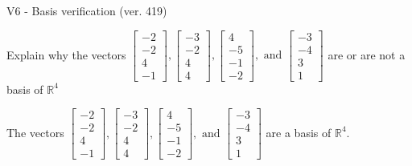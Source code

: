 \begin{exercise}
  \begin{exerciseTitle}V6 - Basis verification (ver. 419)\end{exerciseTitle}
  \begin{exerciseStatement}
    Explain why the vectors \(\left[\begin{array}{r}
-2 \\
-2 \\
4 \\
-1
\end{array}\right] , \left[\begin{array}{r}
-3 \\
-2 \\
4 \\
4
\end{array}\right] , \left[\begin{array}{r}
4 \\
-5 \\
-1 \\
-2
\end{array}\right] , \text{ and } \left[\begin{array}{r}
-3 \\
-4 \\
3 \\
1
\end{array}\right]\) are or are not a basis of \(\mathbb{R}^4\)	


  \end{exerciseStatement}
  \begin{exerciseAnswer}
   The vectors \(\left[\begin{array}{r}
-2 \\
-2 \\
4 \\
-1
\end{array}\right] , \left[\begin{array}{r}
-3 \\
-2 \\
4 \\
4
\end{array}\right] , \left[\begin{array}{r}
4 \\
-5 \\
-1 \\
-2
\end{array}\right] , \text{ and } \left[\begin{array}{r}
-3 \\
-4 \\
3 \\
1
\end{array}\right]\) 
  	 are  a basis of \(\mathbb{R}^4\).
  


  \end{exerciseAnswer}
\end{exercise}